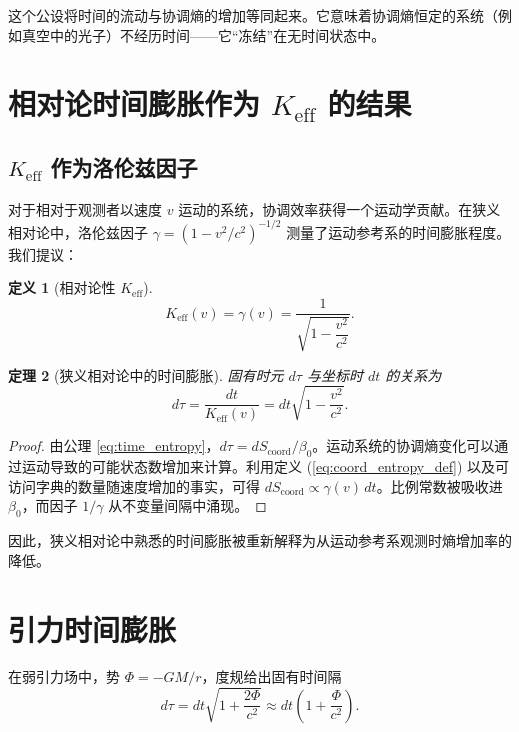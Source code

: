 \documentclass[12pt,a4paper]{article}
\newtheorem{theorem}{定理}[section]
\newtheorem{definition}[theorem]{定义}
\newcommand{\Keff}{K_{\mathrm{eff}}}
\newcommand{\Scoord}{S_{\mathrm{coord}}}
\begin{document}
	这个公设将时间的流动与协调熵的增加等同起来。它意味着协调熵恒定的系统（例如真空中的光子）不经历时间——它“冻结”在无时间状态中。
	
	\section{相对论时间膨胀作为 \texorpdfstring{\(\Keff\)}{Keff} 的结果}
	\label{sec:sr}
	
	\subsection{\(\Keff\) 作为洛伦兹因子}
	
	对于相对于观测者以速度 \(v\) 运动的系统，协调效率获得一个运动学贡献。在狭义相对论中，洛伦兹因子 \(\gamma = (1-v^2/c^2)^{-1/2}\) 测量了运动参考系的时间膨胀程度。我们提议：
	\begin{definition}[相对论性 \(\Keff\)]
		\[
		\Keff(v) = \gamma(v) = \frac{1}{\sqrt{1-\dfrac{v^2}{c^2}}}.
		\]
	\end{definition}
	
	\begin{theorem}[狭义相对论中的时间膨胀]
		固有时元 \(d\tau\) 与坐标时 \(dt\) 的关系为
		\begin{equation}
			d\tau = \frac{dt}{\Keff(v)} = dt\sqrt{1-\frac{v^2}{c^2}}.
		\end{equation}
	\end{theorem}
	
	\begin{proof}
		由公理 \ref{eq:time_entropy}，\(d\tau = d\Scoord/\beta_0\)。运动系统的协调熵变化可以通过运动导致的可能状态数增加来计算。利用定义 (\ref{eq:coord_entropy_def}) 以及可访问字典的数量随速度增加的事实，可得 \(d\Scoord \propto \gamma(v)\, dt\)。比例常数被吸收进 \(\beta_0\)，而因子 \(1/\gamma\) 从不变量间隔中涌现。
	\end{proof}
	
	因此，狭义相对论中熟悉的时间膨胀被重新解释为从运动参考系观测时熵增加率的降低。
	
	\section{引力时间膨胀}
	\label{sec:gr}
	
	在弱引力场中，势 \(\Phi = -GM/r\)，度规给出固有时间隔
	\begin{equation}
		d\tau = dt\sqrt{1 + \frac{2\Phi}{c^2}} \approx dt\left(1 + \frac{\Phi}{c^2}\right).
	\end{equation}
	
\end{document}
